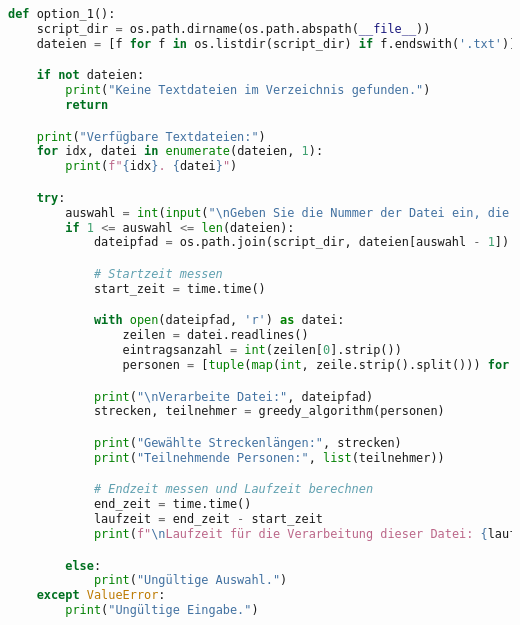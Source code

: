 \documentclass[a4paper,10pt,ngerman]{scrartcl}
\begin{document}
\begin{lstlisting}[language=Python]
def option_1():
    script_dir = os.path.dirname(os.path.abspath(__file__))
    dateien = [f for f in os.listdir(script_dir) if f.endswith('.txt')]

    if not dateien:
        print("Keine Textdateien im Verzeichnis gefunden.")
        return

    print("Verfügbare Textdateien:")
    for idx, datei in enumerate(dateien, 1):
        print(f"{idx}. {datei}")

    try:
        auswahl = int(input("\nGeben Sie die Nummer der Datei ein, die verarbeitet werden soll: "))
        if 1 <= auswahl <= len(dateien):
            dateipfad = os.path.join(script_dir, dateien[auswahl - 1])

            # Startzeit messen
            start_zeit = time.time()

            with open(dateipfad, 'r') as datei:
                zeilen = datei.readlines()
                eintragsanzahl = int(zeilen[0].strip())
                personen = [tuple(map(int, zeile.strip().split())) for zeile in zeilen[1:eintragsanzahl + 1]]

            print("\nVerarbeite Datei:", dateipfad)
            strecken, teilnehmer = greedy_algorithm(personen)

            print("Gewählte Streckenlängen:", strecken)
            print("Teilnehmende Personen:", list(teilnehmer))

            # Endzeit messen und Laufzeit berechnen
            end_zeit = time.time()
            laufzeit = end_zeit - start_zeit
            print(f"\nLaufzeit für die Verarbeitung dieser Datei: {laufzeit:.4f} Sekunden")

        else:
            print("Ungültige Auswahl.")
    except ValueError:
        print("Ungültige Eingabe.")
\end{lstlisting}
\end{document}
